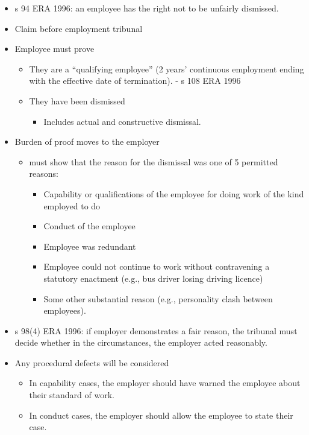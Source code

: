 \documentclass[
]{article}
\providecommand{\tightlist}{%
  \setlength{\itemsep}{0pt}\setlength{\parskip}{0pt}}
\begin{document}
\begin{itemize}
\tightlist
\item
  s 94 ERA 1996: an employee has the right not to be unfairly dismissed.
\item
  Claim before employment tribunal
\item
  Employee must prove

  \begin{itemize}
  \tightlist
  \item
    They are a ``qualifying employee'' (2 years' continuous employment
    ending with the effective date of termination). - s 108 ERA 1996
  \item
    They have been dismissed

    \begin{itemize}
    \tightlist
    \item
      Includes actual and constructive dismissal.
    \end{itemize}
  \end{itemize}
\item
  Burden of proof moves to the employer

  \begin{itemize}
  \tightlist
  \item
    must show that the reason for the dismissal was one of 5 permitted
    reasons:

    \begin{itemize}
    \tightlist
    \item
      Capability or qualifications of the employee for doing work of the
      kind employed to do
    \item
      Conduct of the employee
    \item
      Employee was redundant
    \item
      Employee could not continue to work without contravening a
      statutory enactment (e.g., bus driver losing driving licence)
    \item
      Some other substantial reason (e.g., personality clash between
      employees).
    \end{itemize}
  \end{itemize}
\item
  s 98(4) ERA 1996: if employer demonstrates a fair reason, the tribunal
  must decide whether in the circumstances, the employer acted
  reasonably.
\item
  Any procedural defects will be considered

  \begin{itemize}
  \tightlist
  \item
    In capability cases, the employer should have warned the employee
    about their standard of work.
  \item
    In conduct cases, the employer should allow the employee to state
    their case.
  \end{itemize}
\end{itemize}
\end{document}
